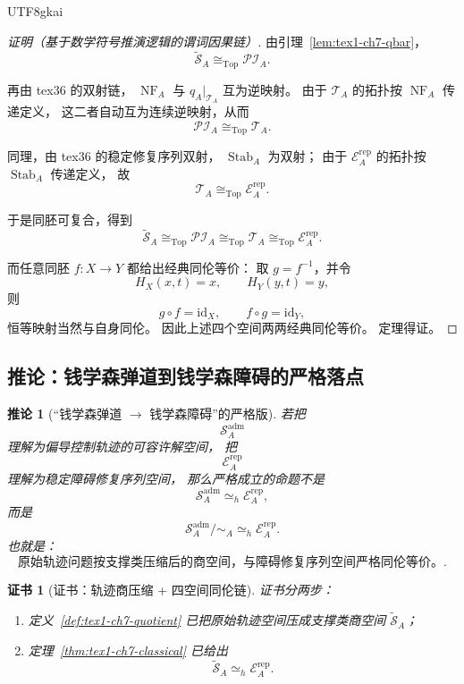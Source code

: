 \documentclass[12pt]{article}
\newtheorem{corollary}{推论}[section]
\newtheorem{Certificate}{证书}[section]
\begin{document}
\begin{CJK*}{UTF8}{gkai}
\begin{proof}[证明（基于数学符号推演逻辑的谓词因果链）]
由引理~\ref{lem:tex1-ch7-qbar}，
\[
  \widetilde{\mathcal S}_A
  \cong_{\mathrm{Top}}
  \mathcal{PI}_A.
\]

再由 tex36 的双射链，
\(\operatorname{NF}_A\) 与 \(q_A|_{\mathcal T_A}\) 互为逆映射。
由于 \(\mathcal T_A\) 的拓扑按 \(\operatorname{NF}_A\) 传递定义，
这二者自动互为连续逆映射，从而
\[
  \mathcal{PI}_A
  \cong_{\mathrm{Top}}
  \mathcal T_A.
\]

同理，由 tex36 的稳定修复序列双射，
\(\operatorname{Stab}_A\) 为双射；
由于 \(\mathcal E_A^{\mathrm{rep}}\) 的拓扑按 \(\operatorname{Stab}_A\) 传递定义，
故
\[
  \mathcal T_A
  \cong_{\mathrm{Top}}
  \mathcal E_A^{\mathrm{rep}}.
\]

于是同胚可复合，得到
\[
  \widetilde{\mathcal S}_A
  \cong_{\mathrm{Top}}
  \mathcal{PI}_A
  \cong_{\mathrm{Top}}
  \mathcal T_A
  \cong_{\mathrm{Top}}
  \mathcal E_A^{\mathrm{rep}}.
\]

而任意同胚 \(f:X\to Y\) 都给出经典同伦等价：
取 \(g=f^{-1}\)，并令
\[
  H_X(x,t)=x,
  \qquad
  H_Y(y,t)=y,
\]
则
\[
  g\circ f=\mathrm{id}_X,
  \qquad
  f\circ g=\mathrm{id}_Y,
\]
恒等映射当然与自身同伦。
因此上述四个空间两两经典同伦等价。
定理得证。
\end{proof}

\subsection{推论：钱学森弹道到钱学森障碍的严格落点}
\label{subsec:tex1-ch7-corollaries}

\begin{corollary}[“钱学森弹道 \(\to\) 钱学森障碍”的严格版]
\label{cor:tex1-ch7-qxs}
若把
\[
  \mathcal S_A^{\mathrm{adm}}
\]
理解为偏导控制轨迹的可容许解空间，
把
\[
  \mathcal E_A^{\mathrm{rep}}
\]
理解为稳定障碍修复序列空间，
那么严格成立的命题不是
\[
  \mathcal S_A^{\mathrm{adm}}\simeq_h \mathcal E_A^{\mathrm{rep}},
\]
而是
\[
  \boxed{
    \mathcal S_A^{\mathrm{adm}}/\sim_A
    \simeq_h
    \mathcal E_A^{\mathrm{rep}}.
  }
\]
也就是：
\[
  \boxed{
    \text{原始轨迹问题按支撑类压缩后的商空间，与障碍修复序列空间严格同伦等价。}
  }.
\]
\end{corollary}

\begin{Certificate}[证书：轨迹商压缩 + 四空间同伦链]
\label{cert:tex1-ch7-qxs}
证书分两步：
\begin{enumerate}
  \item 定义~\ref{def:tex1-ch7-quotient} 已把原始轨迹空间压成支撑类商空间 \(\widetilde{\mathcal S}_A\)；
  \item 定理~\ref{thm:tex1-ch7-classical} 已给出
  \[
    \widetilde{\mathcal S}_A
    \simeq_h
    \mathcal E_A^{\mathrm{rep}}.
  \]
\end{enumerate}
\end{Certificate}


\end{CJK*}
\end{document}

